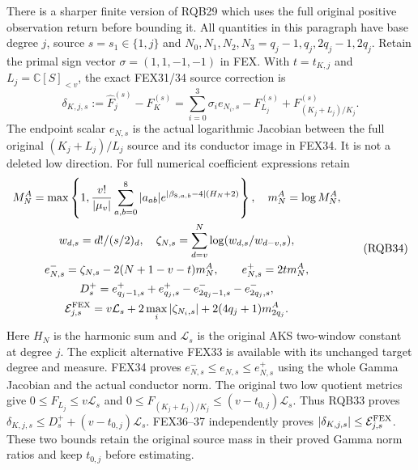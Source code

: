 \documentclass[11pt,a4paper]{article}
\begin{document}
There is a sharper finite version of RQB29 which uses the full original
positive observation return before bounding it. All quantities in this
paragraph have base degree $j$, source $s=s_1\in\{1,j\}$ and
$N_0,N_1,N_2,N_3=q_j-1,q_j,2q_j-1,2q_j$.
Retain the primal sign vector $\sigma=(1,1,-1,-1)$ in FEX.
With $t=t_{K,j}$ and $L_j=\mathbb C[S]_{<v}$, the exact FEX31/34
source correction is
\[
 \delta_{K,j,s}:=\widehat F_j^{(s)}-F_K^{(s)}
       =\sum_{i=0}^3\sigma_i e_{N_i,s}
                    -F_{L_j}^{(s)}+F_{(K_j+L_j)/K_j}^{(s)} .
 \tag{RQB33}
\]
The endpoint scalar $e_{N,s}$ is the actual logarithmic Jacobian
between the full original $(K_j+L_j)/L_j$ source and its conductor
image in FEX34. It is not a deleted low direction. For full numerical
coefficient expressions retain
\[
\begin{gathered}
 M_N^A=\max\left\{1,\frac{v!}{|\mu_v|}
       \sum_{a,b=0}^8|a_{ab}|
         e^{|\beta_{8,a,b}-4|(H_N+2)}\right\},\quad m_N^A=\log M_N^A,\\
 w_{d,s}=d!/(s/2)_d,\quad
 \zeta_{N,s}=\sum_{d=v}^N\log(w_{d,s}/w_{d-v,s}),\\
 e^-_{N,s}=\zeta_{N,s}-2(N+1-v-t)m_N^A,\qquad
 e^+_{N,s}=2t m_N^A,\\
 D_s^+=e^+_{q_j-1,s}+e^+_{q_j,s}
                    -e^-_{2q_j-1,s}-e^-_{2q_j,s},\\
 \mathcal E_{j,s}^{\rm FEX}
       =v\mathcal L_s+2\max_i|\zeta_{N_i,s}|
                           +2(4q_j+1)m_{2q_j}^A .
\end{gathered}\tag{RQB34}
\]
Here $H_N$ is the harmonic sum and $\mathcal L_s$ is the original
AKS two-window constant at degree $j$. The explicit alternative
FEX33 is available with its unchanged target degree and measure.
FEX34 proves $e^-_{N,s}\le e_{N,s}\le e^+_{N,s}$ using the
whole Gamma Jacobian and the actual conductor norm.
The original two low quotient metrics give
$0\le F_{L_j}\le v\mathcal L_s$ and
$0\le F_{(K_j+L_j)/K_j}\le(v-t_{0,j})\mathcal L_s$.
Thus RQB33 proves
$\delta_{K,j,s}\le D_s^++(v-t_{0,j})\mathcal L_s$.
FEX36--37 independently proves
$|\delta_{K,j,s}|\le\mathcal E_{j,s}^{\rm FEX}$.
These two bounds retain the original source mass in their proved
Gamma norm ratios and keep $t_{0,j}$ before estimating.
\end{document}

